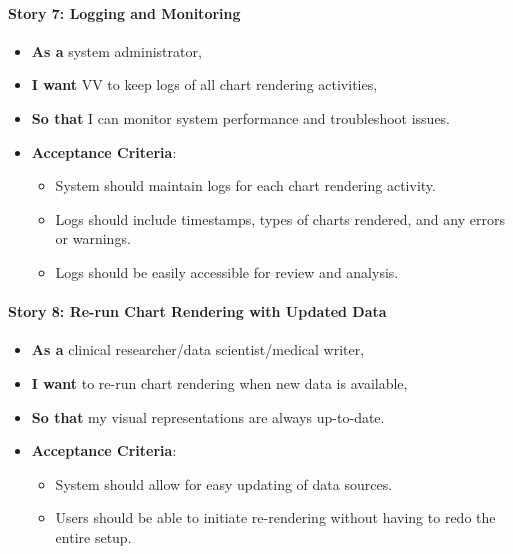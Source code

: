 \paragraph{Story 7: Logging and
Monitoring}\label{story-7-logging-and-monitoring}

\begin{itemize}
\item
  \textbf{As a} system administrator,
\item
  \textbf{I want} VV to keep logs of all chart rendering activities,
\item
  \textbf{So that} I can monitor system performance and troubleshoot
  issues.
\item
  \textbf{Acceptance Criteria}:

  \begin{itemize}
  \item
    System should maintain logs for each chart rendering activity.
  \item
    Logs should include timestamps, types of charts rendered, and any
    errors or warnings.
  \item
    Logs should be easily accessible for review and analysis.
  \end{itemize}
\end{itemize}

\paragraph{Story 8: Re-run Chart Rendering with Updated
Data}\label{story-8-re-run-chart-rendering-with-updated-data}

\begin{itemize}
\item
  \textbf{As a} clinical researcher/data scientist/medical writer,
\item
  \textbf{I want} to re-run chart rendering when new data is available,
\item
  \textbf{So that} my visual representations are always up-to-date.
\item
  \textbf{Acceptance Criteria}:

  \begin{itemize}
  \item
    System should allow for easy updating of data sources.
  \item
    Users should be able to initiate re-rendering without having to redo
    the entire setup.
  \end{itemize}
\end{itemize}

